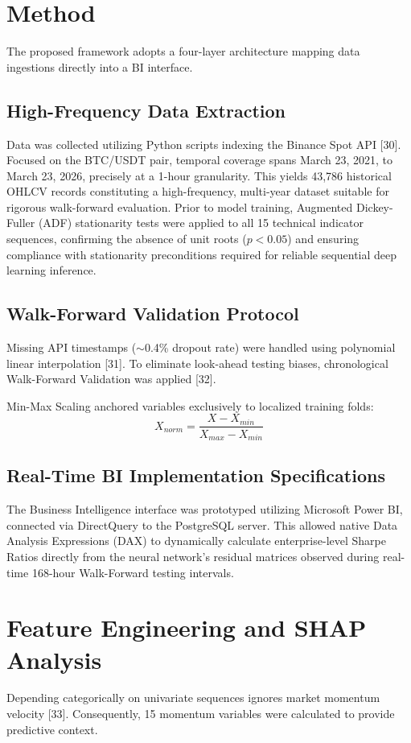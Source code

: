\documentclass[10pt,a4paper]{article}
\begin{document}
\section{Method}
The proposed framework adopts a four-layer architecture mapping data ingestions directly into a BI interface.

\subsection{High-Frequency Data Extraction}
Data was collected utilizing Python scripts indexing the Binance Spot API [30]. Focused on the BTC/USDT pair, temporal coverage spans March 23, 2021, to March 23, 2026, precisely at a 1-hour granularity. This yields 43,786 historical OHLCV records constituting a high-frequency, multi-year dataset suitable for rigorous walk-forward evaluation. Prior to model training, Augmented Dickey-Fuller (ADF) stationarity tests were applied to all 15 technical indicator sequences, confirming the absence of unit roots ($p < 0.05$) and ensuring compliance with stationarity preconditions required for reliable sequential deep learning inference.

\subsection{Walk-Forward Validation Protocol}
Missing API timestamps ($\sim$0.4\% dropout rate) were handled using polynomial linear interpolation [31]. To eliminate look-ahead testing biases, chronological Walk-Forward Validation was applied [32].

Min-Max Scaling anchored variables exclusively to localized training folds:
\begin{equation}
X_{norm} = \frac{X - X_{min}}{X_{max} - X_{min}}
\end{equation}

\subsection{Real-Time BI Implementation Specifications}
The Business Intelligence interface was prototyped utilizing Microsoft Power BI, connected via DirectQuery to the PostgreSQL server. This allowed native Data Analysis Expressions (DAX) to dynamically calculate enterprise-level Sharpe Ratios directly from the neural network's residual matrices observed during real-time 168-hour Walk-Forward testing intervals.

\section{Feature Engineering and SHAP Analysis}
Depending categorically on univariate sequences ignores market momentum velocity [33]. Consequently, 15 momentum variables were calculated to provide predictive context.
\end{document}
